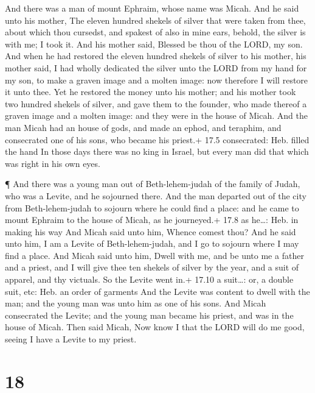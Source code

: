  And there was a man of mount Ephraim, whose name was Micah.
 And he said unto his mother, The eleven hundred shekels of
silver that were taken from thee, about which thou cursedst, and spakest
of also in mine ears, behold, the silver is with me; I took it. And his
mother said, Blessed be thou of the LORD, my son.  And when
he had restored the eleven hundred shekels of silver to his mother, his
mother said, I had wholly dedicated the silver unto the LORD from my
hand for my son, to make a graven image and a molten image: now
therefore I will restore it unto thee.  Yet he restored the
money unto his mother; and his mother took two hundred shekels of
silver, and gave them to the founder, who made thereof a graven image
and a molten image: and they were in the house of Micah. 
And the man Micah had an house of gods, and made an ephod, and teraphim,
and consecrated one of his sons, who became his priest.+ 17.5
consecrated: Heb. filled the hand  In those days there was
no king in Israel, but every man did that which was right in his own
eyes.

 ¶ And there was a young man out of Beth-lehem-judah of the
family of Judah, who was a Levite, and he sojourned there. 
And the man departed out of the city from Beth-lehem-judah to sojourn
where he could find a place: and he came to mount Ephraim to the house
of Micah, as he journeyed.+ 17.8 as he\ldots: Heb. in making his way
 And Micah said unto him, Whence comest thou? And he said
unto him, I am a Levite of Beth-lehem-judah, and I go to sojourn where I
may find a place.  And Micah said unto him, Dwell with me,
and be unto me a father and a priest, and I will give thee ten shekels
of silver by the year, and a suit of apparel, and thy victuals. So the
Levite went in.+ 17.10 a suit\ldots: or, a double suit, etc: Heb. an
order of garments  And the Levite was content to dwell with
the man; and the young man was unto him as one of his sons.
 And Micah consecrated the Levite; and the young man became
his priest, and was in the house of Micah.  Then said
Micah, Now know I that the LORD will do me good, seeing I have a Levite
to my priest.

\hypertarget{section-17}{%
\section{18}\label{section-17}}

